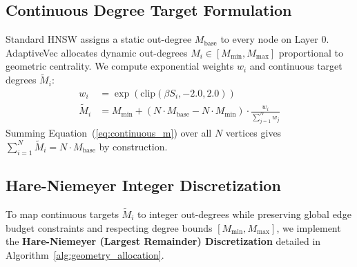 \documentclass[10pt,journal,compsoc]{IEEEtran}
\begin{document}
\subsection{Continuous Degree Target Formulation}
Standard HNSW assigns a static out-degree $M_{\text{base}}$ to every node on Layer 0. AdaptiveVec allocates dynamic out-degrees $M_i \in [M_{\min}, M_{\max}]$ proportional to geometric centrality. We compute exponential weights $w_i$ and continuous target degrees $\tilde{M}_i$:
\begin{align}
w_i &= \exp\left( \text{clip}(\beta S_i, -2.0, 2.0) \right) \label{eq:exp_weight} \\
\tilde{M}_i &= M_{\min} + (N \cdot M_{\text{base}} - N \cdot M_{\min}) \cdot \frac{w_i}{\sum_{j=1}^N w_j} \label{eq:continuous_m}
\end{align}
Summing Equation~(\ref{eq:continuous_m}) over all $N$ vertices gives $\sum_{i=1}^N \tilde{M}_i = N \cdot M_{\text{base}}$ by construction.

\subsection{Hare-Niemeyer Integer Discretization}
To map continuous targets $\tilde{M}_i$ to integer out-degrees while preserving global edge budget constraints and respecting degree bounds $[M_{\min}, M_{\max}]$, we implement the \textbf{Hare-Niemeyer (Largest Remainder) Discretization} detailed in Algorithm~\ref{alg:geometry_allocation}.
\end{document}
